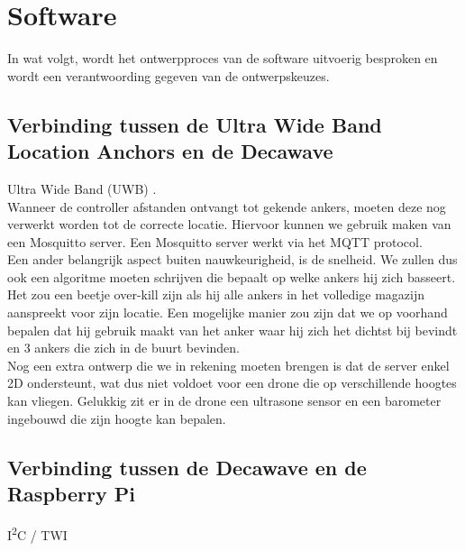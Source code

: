 \chapter{Software}
In wat volgt, wordt het ontwerpproces van de software uitvoerig besproken en wordt een verantwoording gegeven van de ontwerpskeuzes.

\section{Verbinding tussen de Ultra Wide Band Location Anchors en de Decawave} \label{sec:uwb_decawave}
Ultra Wide Band (UWB) \cite{uwb2016}.\\

Wanneer de controller afstanden ontvangt tot gekende ankers, moeten deze nog verwerkt worden tot de correcte locatie. Hiervoor kunnen we gebruik maken van een Mosquitto server. Een Mosquitto server werkt via het MQTT protocol.\\

Een ander belangrijk aspect buiten nauwkeurigheid, is de snelheid. We zullen dus ook een algoritme moeten schrijven die bepaalt op welke ankers hij zich basseert. Het zou een beetje over-kill zijn als hij alle ankers in het volledige magazijn aanspreekt voor zijn locatie. Een mogelijke manier zou zijn dat we op voorhand bepalen dat hij gebruik maakt van het anker waar hij zich het dichtst bij bevindt en 3 ankers die zich in de buurt bevinden.\\

Nog een extra ontwerp die we in rekening moeten brengen is dat de server enkel 2D ondersteunt, wat dus niet voldoet voor een drone die op verschillende hoogtes kan vliegen. Gelukkig zit er in de drone een ultrasone sensor en een barometer ingebouwd die zijn hoogte kan bepalen. 

\section{Verbinding tussen de Decawave en de Raspberry Pi} \label{sec:decawave_raspberry}
I\textsuperscript{2}C / TWI

